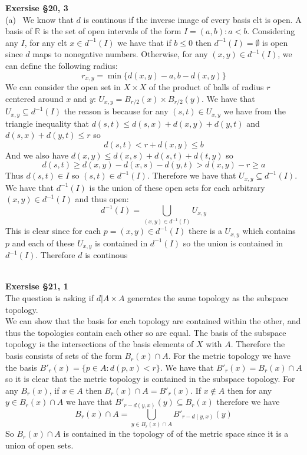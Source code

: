 \documentclass[12pt]{article}
\newenvironment{ques}[1]{\textbf{Exersise #1}\vspace{1 mm}\\ }{\bigskip}
\theoremstyle{definition}
\newcommand{\R}{\mathbb R}
\begin{document}
\begin{ques}{\S 20, 3}
	(a) \ We know that $d$ is continous if the inverse image of every basis elt
	is open. A basis of $\R$ is the set of open intervals of the form $I =
	(a,b): a < b$.  Considering any $I$, for any elt $x \in d^{-1}(I)$ we have
	that if $b \leq 0$ then $d^{-1}(I) = \emptyset$ is open since $d$ maps to
	nonegative numbers. Otherwise, for any $(x,y) \in d^{-1}(I)$, we can define
	the following radius:
	$$r_{x,y} = \min \{ d(x,y) - a, b - d(x,y)\}$$
	We can consider the open set in $X \times X$ of the product of balls of
	radius $r$ centered around $x$ and $y$:  $U_{x,y} = B_{r/2}(x) \times B_{r/2}(y)$.
	We have that $U_{x,y} \subseteq d^{-1}(I)$ the reason is because for any
	$(s,t) \in U_{x,y}$ we have from the triangle inequality that $d(s,t) \leq
	d(s,x) + d(x,y) + d(y,t)$ and $d(s,x) + d(y,t) \leq r$ so 
	$$d(s,t) < r + d(x,y) \leq b$$
	And we also have $d(x,y) \leq d(x,s) + d(s,t) + d(t,y)$ so
	$$d(s,t) \geq d(x,y) - d(x,s) - d(y,t) > d(x,y) - r \geq a$$
	Thus $d(s,t) \in I$ so $(s,t)
	\in d^{-1}(I)$. Therefore we have that $U_{x,y} \subseteq d^{-1}(I)$. We
	have that $d^{-1}(I)$ is the union of these open sets for each arbitrary
	$(x,y) \in d^{-1}(I)$ and thus open:
	$$d^{-1}(I) = \bigcup_{(x,y) \in d^{-1}(I)} U_{x,y}$$
	This is clear since for each $p = (x,y) \in d^{-1}(I)$ there is a $U_{x,y}$
	which contains $p$ and each of these $U_{x,y}$ is contained in $d^{-1}(I)$
	so the union is contained in $d^{-1}(I)$. Therefore $d$ is continous\\
	\\
\end{ques}

\begin{ques}{\S 21, 1}
	The question is asking if $d|A \times A$ generates the same topology as the
	subspace topology.\\
	We can show that the basis for each topology are contained within the
	other, and thus the topologies contain each other so are equal. The basis of
	the subspace topology is the intersections of the
	basis elements of $X$ with $A$. Therefore the basis consists of sets of the
	form $B_r(x) \cap A$. For the metric topology we have the basis $B'_r(x) =
	\{p \in A: d(p,x) < r\}$. We have that $B'_r(x) = B_r(x) \cap A$ so it is
	clear that the metric topology is contained in the subspace topology. For
	any $B_r(x)$, if $x \in A$ then $B_r(x) \cap A = B'_r(x)$. If $x \notin A$
	then for any $y \in B_r(x) \cap A$ we have that $B'_{r - d(y,x)}(y)
	\subseteq B_r(x)$ therefore we have
	$$B_r(x) \cap A = \bigcup_{y \in B_r(x) \cap A} B'_{r - d(y,x)}(y)$$
	So $B_r(x) \cap A$ is contained in the topology of of the metric space
	since it is a union of open sets.
\end{ques}
\end{document}
